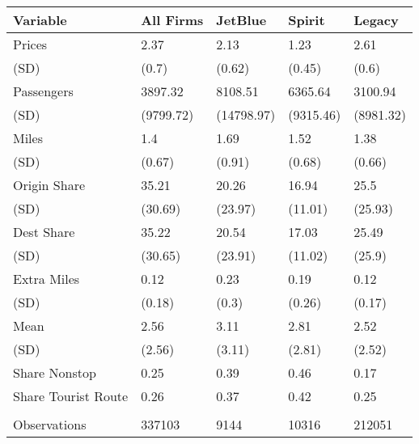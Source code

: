 
\begin{tabular}[t]{lllll}
\toprule
Variable & All Firms & JetBlue & Spirit & Legacy\\
\midrule
Prices & 2.37 & 2.13 & 1.23 & 2.61\\
(SD) & (0.7) & (0.62) & (0.45) & (0.6)\\
Passengers & 3897.32 & 8108.51 & 6365.64 & 3100.94\\
(SD) & (9799.72) & (14798.97) & (9315.46) & (8981.32)\\
Miles & 1.4 & 1.69 & 1.52 & 1.38\\
(SD) & (0.67) & (0.91) & (0.68) & (0.66)\\
Origin Share & 35.21 & 20.26 & 16.94 & 25.5\\
(SD) & (30.69) & (23.97) & (11.01) & (25.93)\\
Dest Share & 35.22 & 20.54 & 17.03 & 25.49\\
(SD) & (30.65) & (23.91) & (11.02) & (25.9)\\
Extra Miles & 0.12 & 0.23 & 0.19 & 0.12\\
(SD) & (0.18) & (0.3) & (0.26) & (0.17)\\
Mean & 2.56 & 3.11 & 2.81 & 2.52\\
(SD) & (2.56) & (3.11) & (2.81) & (2.52)\\
Share Nonstop & 0.25 & 0.39 & 0.46 & 0.17\\
Share Tourist Route & 0.26 & 0.37 & 0.42 & 0.25\\
\midrule\\
Observations & 337103 & 9144 & 10316 & 212051\\
\bottomrule
\end{tabular}
